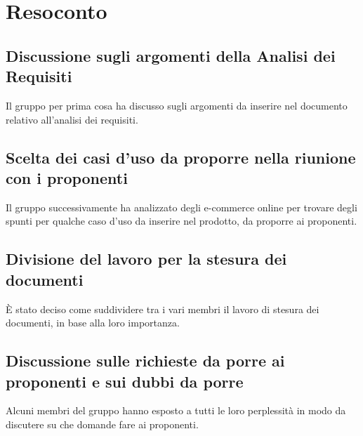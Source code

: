 \documentclass[a4paper]{article}
\begin{document}
    \section{Resoconto}
    
        \subsection{Discussione sugli argomenti della Analisi dei Requisiti}
        Il gruppo per prima cosa ha discusso sugli argomenti da inserire nel documento relativo all'analisi dei requisiti.
        \subsection{Scelta dei casi d'uso da proporre nella riunione con i proponenti}
        Il gruppo successivamente ha analizzato degli e-commerce online per trovare degli spunti per qualche caso d'uso da inserire nel prodotto, da proporre ai proponenti.
        \subsection{Divisione del lavoro per la stesura dei documenti}
        È stato deciso come suddividere tra i vari membri il lavoro di stesura dei documenti, in base alla loro importanza.
        \subsection{Discussione sulle richieste da porre ai proponenti e sui dubbi da porre}
        Alcuni membri del gruppo hanno esposto a tutti le loro perplessità in modo da discutere su che domande fare ai proponenti.
        
\end{document}
